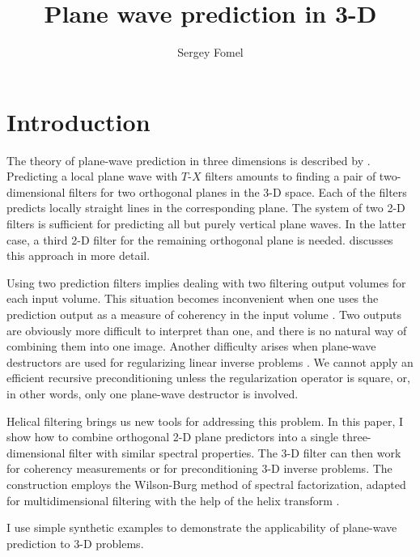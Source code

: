 
\title{Plane wave prediction in 3-D}


\author{Sergey Fomel}

\shortpaper
\maketitle

\section{Introduction}

The theory of plane-wave prediction in three dimensions is described
by \cite{Claerbout.sep.77.19,gee}. Predicting a local plane wave with
$T$-$X$ filters amounts to finding a pair of two-dimensional filters
for two orthogonal planes in the 3-D space.  Each of the filters
predicts locally straight lines in the corresponding plane. The system
of two 2-D filters is sufficient for predicting all but purely
vertical plane waves. In the latter case, a third 2-D filter for the
remaining orthogonal plane is needed.  \cite{Schwab.sepphd.99}
discusses this approach in more detail.
\par
Using two prediction filters implies dealing with two filtering output
volumes for each input volume. This situation becomes inconvenient
when one
uses the prediction output as a measure of coherency in the input
volume \cite[]{Claerbout.sep.77.19,Schwab.sep.92.29}. Two outputs are
obviously more difficult to interpret than one, and there is no
natural way of combining them into one image. Another difficulty
arises when plane-wave destructors are used for regularizing linear
inverse problems \cite[]{Clapp.sep.95.bob1}. We cannot
apply an efficient recursive preconditioning
\cite[]{Claerbout.sep.97.jon2} unless the regularization operator is
square, or, in other words, only one plane-wave destructor is involved.
\par
Helical filtering \cite[]{GEO63-05-15321541} brings us new tools for
addressing this problem. In this paper, I show how to combine
orthogonal 2-D plane predictors into a single three-dimensional filter
with similar spectral properties. The 3-D filter can then work for
coherency measurements or for preconditioning 3-D inverse problems.
The construction employs the Wilson-Burg method of spectral
factorization, adapted for multidimensional filtering with the help of
the helix transform \cite[]{Sava.sep.97.paul1}.
\par
I use simple synthetic examples to demonstrate the applicability of 
plane-wave prediction to 3-D problems.

